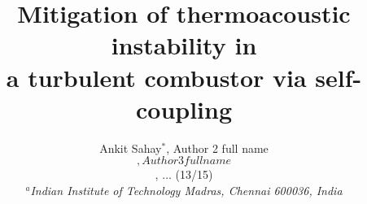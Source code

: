 \documentclass[twocolumn,10pt]{article} %
\begin{document}
\title{\LARGE Mitigation of thermoacoustic instability in \\
                     a turbulent combustor via self-coupling}

\author{{\large Ankit Sahay$^{*}$, Author 2 full name$$, Author 3 full name$$, $\ldots$ (13/15)}\\[10pt]
        {\footnotesize \em $^a$Indian Institute of Technology Madras, Chennai 600036, India }\\[-5pt]}

\date{}


\small
\baselineskip 10pt

\end{document}
